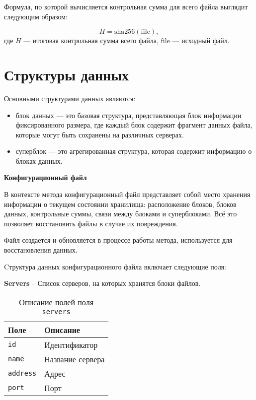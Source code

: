 Формула, по которой вычисляется контрольная сумма для всего файла выглядит следующим образом:

\begin{equation}
\label{eq:checksum_file}
H =  \mathrm{sha256}(\mathrm{file}),
\end{equation}
где $H$ --- итоговая контрольная сумма всего файла, $\mathrm{file}$ --- исходный файл.

\newpage
\section{Структуры данных}
\begin{flushleft}
Основными структурами данных являются:
\end{flushleft}

\begin{itemize}
\item блок данных ---  это базовая структура, представляющая блок информации фиксированного размера, где каждый блок содержит фрагмент данных файла, которые могут быть сохранены на различных серверах.

\item суперблок --- это агрегированная структура, которая содержит информацию о блоках данных.
\end{itemize}

\textbf{Конфигурационный файл}

В контексте метода конфигурационный файл представляет собой место хранения информации о текущем состоянии хранилища: расположение блоков, блоков данных, контрольные суммы, связи между блоками и суперблоками. Всё это позволяет восстановить файлы в случае их повреждения.  
%
%

Файл создается и обновляется в процессе работы метода, используется для восстановления данных.

Cтруктура данных конфигурационного файла включает следующие поля:  

\textbf{Servers} -- Список серверов, на которых хранятся блоки файлов.
\begin{table}[h]
    \centering
    \caption{Описание полей поля \texttt{servers}}
    \label{tbl:servers}
        \begin{tabular}{|p{}|p{}|}
            \hline
            \textbf{Поле} & \textbf{Описание} \\\hline
            \texttt{id} & Идентификатор \\\hline
            \texttt{name} & Название сервера \\\hline
            \texttt{address} & Адрес \\\hline
            \texttt{port} & Порт \\\hline
        \end{tabular}
\end{table}

